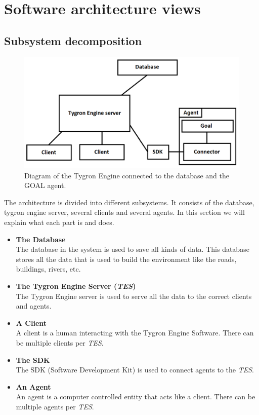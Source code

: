 \section{Software architecture views}

\subsection{Subsystem decomposition}
\begin{figure}[h!]
  \centering
  \includegraphics[scale=0.35]{Tygrondatabase1.png}
  \caption{Diagram of the Tygron Engine connected to the database and the GOAL agent.}
  \label{fig:tygron1}
\end{figure}
The architecture is divided into different subsystems. It consists of the database, tygron engine server, several clients and several agents. In this section we will explain what each part is and does.

\begin{itemize}
	\item \textbf{The Database} \\ 
	The database in the system is used to save all kinds of data. This database stores all the data that is used to build the environment like the roads, buildings, rivers, etc. 
	\item \textbf{The Tygron Engine Server (\textit{TES})} \\ 
	The Tygron Engine server is used to serve all the data to the correct clients and agents. 
	\item \textbf{A Client} \\
	A client is a human interacting with the Tygron Engine Software. There can be multiple clients per \textit{TES}.
	\item \textbf{The SDK} \\
	The SDK (Software Development Kit) is used to connect agents to the \textit{TES}.
	\item \textbf{An Agent} \\
	An agent is a computer controlled entity that acts like a client. There can be multiple agents per \textit{TES}. 
\end{itemize}

